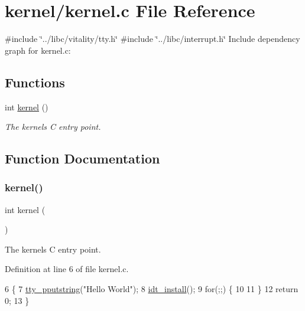 \hypertarget{a00014}{}\section{kernel/kernel.c File Reference}
\label{a00014}
{\ttfamily \#include \char`\"{}../libc/vitality/tty.\+h\char`\"{}}\newline
{\ttfamily \#include \char`\"{}../libc/interrupt.\+h\char`\"{}}\newline
Include dependency graph for kernel.\+c\+:
\subsection*{Functions}
\begin{DoxyCompactItemize}
\item 
int \hyperlink{a00014_a4ee3d1f05046b7afc6b4d516bf10667a_a4ee3d1f05046b7afc6b4d516bf10667a}{kernel} ()
\begin{DoxyCompactList}\small\item\em The kernels C entry point. \end{DoxyCompactList}\end{DoxyCompactItemize}


\subsection{Function Documentation}
\mbox{\label{a00014_a4ee3d1f05046b7afc6b4d516bf10667a_a4ee3d1f05046b7afc6b4d516bf10667a}} 
\subsubsection{\texorpdfstring{kernel()}{kernel()}}
{\footnotesize\ttfamily int kernel (\begin{DoxyParamCaption}{ }\end{DoxyParamCaption})}



The kernels C entry point. 



Definition at line 6 of file kernel.\+c.


\begin{DoxyCode}
6              \{
7     \hyperlink{a00053_ade960b1320324706aac6c00cc6b1b2fe_ade960b1320324706aac6c00cc6b1b2fe}{tty\_pputstring}(\textcolor{stringliteral}{"Hello World"});
8     \hyperlink{a00023_a9817da253735954f4767c5ba6155aa0d_a9817da253735954f4767c5ba6155aa0d}{idt\_install}();
9     \textcolor{keywordflow}{for}(;;) \{
10 
11     \}
12     \textcolor{keywordflow}{return} 0;
13 \}
\end{DoxyCode}
